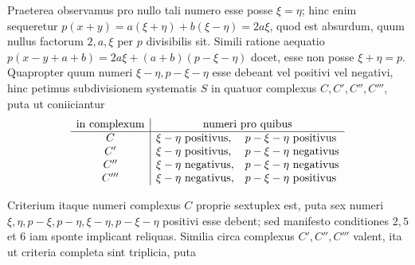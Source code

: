 Praeterea observamus pro nullo tali numero esse posse $\xi=\eta$; hinc enim sequeretur $p(x+y)=a(\xi+\eta)+b(\xi-\eta)=2a\xi$, quod est absurdum, quum nullus factorum $2,a,\xi$ per $p$ divisibilis sit. Simili ratione aequatio $p(x-y+a+b)=2a\xi+(a+b)(p-\xi-\eta)$ docet, esse non posse $\xi+\eta=p$. Quapropter quum numeri $\xi-\eta,p-\xi-\eta$ esse debeant vel positivi vel negativi, hinc petimus subdivisionem systematis $S$ in quatuor complexus $C,C',C'',C'''$, puta ut coniiciantur
\[
\begin{array}{c|ll}
\text{in complexum}&\multicolumn{2}{c}{\text{numeri pro quibus}}\\\hline
C&\xi-\eta\text{ positivus},&p-\xi-\eta\text{ positivus}\\
C'&\xi-\eta\text{ positivus},&p-\xi-\eta\text{ negativus}\\
C''&\xi-\eta\text{ negativus},&p-\xi-\eta\text{ negativus}\\
C'''&\xi-\eta\text{ negativus},&p-\xi-\eta\text{ positivus}
\end{array}
\]

Criterium itaque numeri complexus $C$ proprie sextuplex est, puta sex numeri $\xi,\eta,p-\xi,p-\eta,\xi-\eta,p-\xi-\eta$ positivi esse debent; sed manifesto conditiones $2,5$ et $6$ iam sponte implicant reliquas. Similia circa complexus $C',C'',C'''$ valent, ita ut criteria completa sint triplicia, puta
